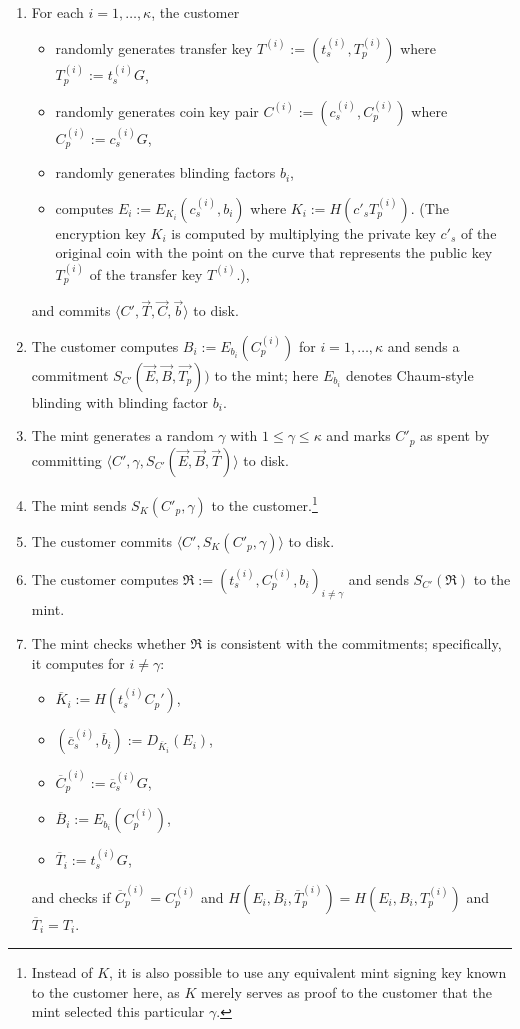 \documentclass{llncs}
\begin{document}
\begin{enumerate}
  \item For each $i = 1,\ldots,\kappa$, the customer
    \begin{itemize}
      \item randomly generates transfer key $T^{(i)} := \left(t^{(i)}_s,T^{(i)}_p\right)$ where $T^{(i)}_p := t^{(i)}_s G$,
      \item randomly generates coin key pair $C^{(i)} := \left(c_s^{(i)}, C_p^{(i)}\right)$ where $C^{(i)}_p := c^{(i)}_s G$,
      \item randomly generates blinding factors $b_i$,
      \item computes $E_i := E_{K_i}\left(c_s^{(i)}, b_i\right)$ where $K_i := H(c'_s T_p^{(i)})$. (The encryption key $K_i$ is
            computed by multiplying the private key $c'_s$ of the original coin with the point on the curve
            that represents the public key $T^{(i)}_p$ of the transfer key $T^{(i)}$.),
    \end{itemize}
    and commits $\langle C', \vec{T}, \vec{C}, \vec{b} \rangle$ to disk.
  \item The customer computes $B_i := E_{b_i}(C^{(i)}_p)$  for $i=1,\ldots,\kappa$ and sends a commitment
    $S_{C'}(\vec{E}, \vec{B}, \vec{T_p}))$ to the mint;
    here $E_{b_i}$ denotes Chaum-style blinding with blinding factor $b_i$.
  \item The mint generates a random $\gamma$ with $1 \le \gamma \le \kappa$ and
    marks $C'_p$ as spent by committing
    $\langle C', \gamma, S_{C'}(\vec{E}, \vec{B}, \vec{T}) \rangle$ to disk.
  \item The mint sends $S_K(C'_p, \gamma)$ to the customer.\footnote{Instead of $K$, it is also
    possible to use any equivalent mint signing key known to the customer here, as $K$ merely
    serves as proof to the customer that the mint selected this particular $\gamma$.}
  \item The customer commits $\langle C', S_K(C'_p, \gamma) \rangle$ to disk.
  \item The customer computes $\mathfrak{R} := \left(t_s^{(i)}, C_p^{(i)}, b_i\right)_{i \ne \gamma}$
        and sends $S_{C'}(\mathfrak{R})$ to the mint.
  \item \label{step:refresh-ccheck} The mint checks whether $\mathfrak{R}$ is consistent with the commitments;
        specifically, it computes for $i \not= \gamma$:
    \begin{itemize}
      \item $\overline{K}_i := H(t_s^{(i)} C_p')$,
      \item $(\overline{c}_s^{(i)}, \overline{b}_i) := D_{\overline{K}_i}(E_i)$,
      \item $\overline{C}^{(i)}_p := \overline{c}_s^{(i)} G$,
      \item $\overline{B}_i := E_{b_i}(C_p^{(i)})$,
      \item $\overline{T}_i := t_s^{(i)} G$,
    \end{itemize}
    and checks if $\overline{C}^{(i)}_p = C^{(i)}_p$ and $H(E_i, \overline{B}_i, \overline{T}^{(i)}_p) = H(E_i, B_i, T^{(i)}_p)$
    and $\overline{T}_i = T_i$.


\end{enumerate}
\end{document}
